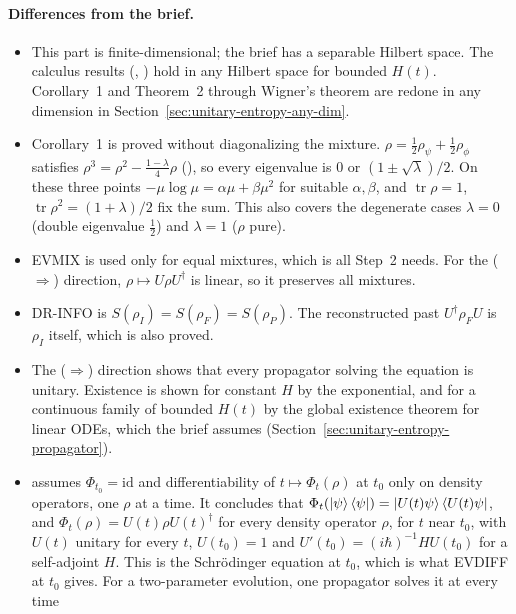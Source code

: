 \documentclass[11pt]{article}
\begin{document}
\paragraph{Differences from the brief.}
\begin{itemize}
\item This part is finite-dimensional; the brief has a separable Hilbert space. The calculus
  results (, ) hold in any Hilbert
  space for bounded $H(t)$. Corollary~1 and Theorem~2 through Wigner's theorem are redone in
  any dimension in Section~\ref{sec:unitary-entropy-any-dim}.
\item Corollary~1 is proved without diagonalizing the mixture. $\rho = \tfrac12\rho_\psi +
  \tfrac12\rho_\phi$ satisfies $\rho^3 = \rho^2 - \frac{1-\lambda}{4}\rho$
  (), so every eigenvalue is $0$ or $(1 \pm \sqrt\lambda)/2$. On these three
  points $-\mu\log\mu = \alpha\mu + \beta\mu^2$ for suitable $\alpha, \beta$, and
  $\operatorname{tr}\rho = 1$, $\operatorname{tr}\rho^2 = (1+\lambda)/2$ fix the sum. This also
  covers the degenerate cases $\lambda = 0$ (double eigenvalue $\tfrac12$) and $\lambda = 1$
  ($\rho$ pure).
\item [B]EVMIX is used only for equal mixtures, which is all Step~2 needs. For the
  ($\Rightarrow$) direction, $\rho \mapsto U\rho U^\dagger$ is linear, so it preserves all mixtures.
\item DR-INFO is $S(\rho_I) = S(\rho_F) = S(\rho_P)$. The reconstructed past
  $U^\dagger\rho_F U$ is $\rho_I$ itself, which is also proved.
\item The ($\Rightarrow$) direction shows that every propagator solving the equation is unitary.
  Existence is shown for constant $H$ by the exponential, and for a continuous family of bounded
  $H(t)$ by the global existence theorem for linear ODEs, which the brief assumes
  (Section~\ref{sec:unitary-entropy-propagator}).
\item {} assumes $\Phi_{t_0} = \mathrm{id}$ and differentiability of
  $t \mapsto \Phi_t(\rho)$ at $t_0$ only on density operators, one $\rho$ at a time. It concludes
  that $\Phi_t(\ket{\psi}\bra{\psi}) = \ket{U(t)\psi}\bra{U(t)\psi}$, and
  $\Phi_t(\rho) = U(t)\rho U(t)^\dagger$ for every density operator $\rho$, for $t$ near $t_0$, with
  $U(t)$ unitary for every $t$, $U(t_0) = 1$ and $U'(t_0) = (i\hbar)^{-1} H U(t_0)$ for a
  self-adjoint $H$. This is the Schr\"odinger equation at $t_0$, which is what EVDIFF at $t_0$
  gives. For a two-parameter evolution, one propagator solves it at every time

\end{itemize}
\end{document}
